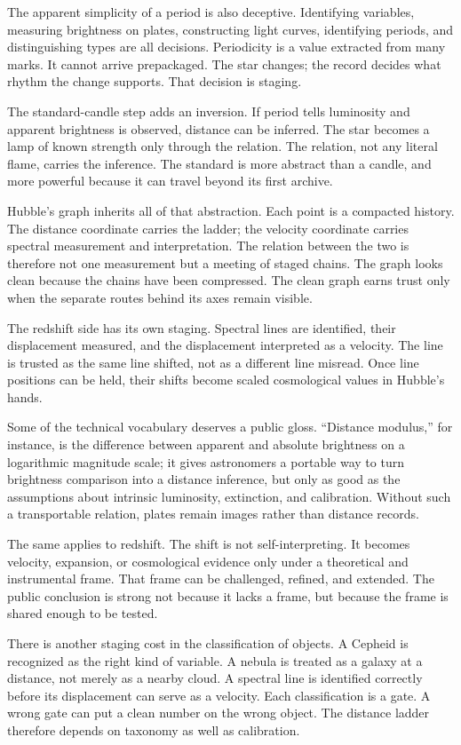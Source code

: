 The apparent simplicity of a period is also deceptive. Identifying
variables, measuring brightness on plates, constructing light curves,
identifying periods, and distinguishing types are all decisions.
Periodicity is a value extracted from many marks. It cannot arrive
prepackaged. The star changes; the record decides what rhythm the change
supports. That decision is staging.

The standard-candle step adds an inversion. If period tells luminosity and
apparent brightness is observed, distance can be inferred. The star becomes
a lamp of known strength only through the relation. The relation, not any
literal flame, carries the inference. The standard is more abstract than a
candle, and more powerful because it can travel beyond its first archive.

Hubble's graph inherits all of that abstraction. Each point is a compacted
history. The distance coordinate carries the ladder; the velocity
coordinate carries spectral measurement and interpretation. The relation
between the two is therefore not one measurement but a meeting of staged
chains. The graph looks clean because the chains have been compressed. The
clean graph earns trust only when the separate routes behind its axes
remain visible.

The redshift side has its own staging. Spectral lines are identified,
their displacement measured, and the displacement interpreted as a
velocity. The line is trusted as the same line shifted, not as a different
line misread. Once line positions can be held, their shifts become scaled
cosmological values in Hubble's hands.

Some of the technical vocabulary deserves a public gloss. ``Distance
modulus,'' for instance, is the difference between apparent and absolute
brightness on a logarithmic magnitude scale; it gives astronomers a
portable way to turn brightness comparison into a distance inference, but
only as good as the assumptions about intrinsic luminosity, extinction,
and calibration. Without such a transportable relation, plates remain
images rather than distance records.

The same applies to redshift. The shift is not self-interpreting. It
becomes velocity, expansion, or cosmological evidence only under a
theoretical and instrumental frame. That frame can be challenged, refined,
and extended. The public conclusion is strong not because it lacks a
frame, but because the frame is shared enough to be tested.

There is another staging cost in the classification of objects. A Cepheid
is recognized as the right kind of variable. A nebula is treated as a
galaxy at a distance, not merely as a nearby cloud. A spectral line is
identified correctly before its displacement can serve as a velocity. Each
classification is a gate. A wrong gate can put a clean number on the wrong
object. The distance ladder therefore depends on taxonomy as well as
calibration.

